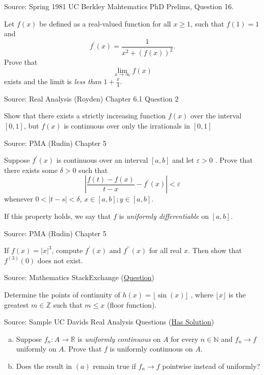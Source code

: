 \documentclass[letterpaper,twoside]{book}
\newcounter{ex}
\begin{document}
\begin{que}
		Source: Spring 1981 UC Berkley Mahtematics PhD Prelims, Question 16.

Let $f(x)$ be defined as a real-valued function for all $x\ge 1$, such that $f(1)=1$ and \[f^\prime(x) = \frac{1}{x^2 + (f(x))^2}.\]
Prove that \[\lim_{x\to\infty}f(x)\] exists and the limit is \emph{less than} $1+\frac{\pi}{4}$. 
\end{que}	
\begin{que}
Source: Real Analysis (Royden) Chapter 6.1 Question 2

Show that there exists a strictly increasing function $f(x)$ over the interval $[0,1]$, but $f(x)$ is continuous over only the irrationals in $[0,1]$ 
\end{que}	
\begin{que}
Source: PMA (Rudin) Chapter 5

Suppose $f^\prime(x)$ is continuous over an interval $[a,b]$ and let $\varepsilon>0$ . Prove that there exists some $\delta>0$ such that 
\[\left|\frac{f(t)-f(x)}{t-x}- f^\prime(x)\right|<\varepsilon\]
whenever $0<\left|t-s\right|<\delta$, $x\in [a,b]; y\in [a,b]$.

If this property holds, we say that $f$ is \emph{uniformly differentiable} on $[a,b]$.
\end{que}	
\begin{que}
Source: PMA (Rudin) Chapter 5

If $f(x) = \left|x\right|^3$, compute $f^\prime(x) \text{ and } f^{\prime\prime}(x)$  for all real $x$. Then show that $f^{(3)}(0)$ does not exist. 
\end{que}	
\begin{que}
		Source: Mathematics StackExchange (\href{https://math.stackexchange.com/questions/4797989/determine-the-points-of-continuity-of-hx-lfloor-sinx-rfloor}{Question})

Determine the points of continuity of $h(x)=\lfloor \sin(x)\rfloor$ , where $\lfloor x \rfloor$  is the greatest $m\in\mathbb{Z}$ such that $m\le x$  (floor function).
\end{que}	
\begin{que}
		Source: Sample UC Davids Real Analysis Questions (\href{https://www.math.ucdavis.edu/~hunter/m125a/m125a_sample_final_solutions.pdf}{Has Solution})

		\begin{enumerate}[(a)]
				\item Suppose $f_n\colon A \to \mathbb{R}$ is \emph{uniformly continuous} on $A$ for every $n\in\mathbb{N}$ and $f_n\to f$ uniformly on $A$.
						Prove that $f$ is uniformly continuous on $A$. 
				\item Does the result in $(a)$ remain true if $f_n\to f$ pointwise instead of uniformly?
		\end{enumerate}	
\end{que}	
\end{document}
